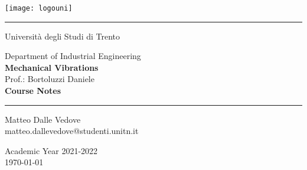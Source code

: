 \documentclass[10pt,letterpaper,oneside,openright]{book}
\begin{document}
	
	\frontmatter
	
	\begin{center}
		\vspace{3cm}
		\thispagestyle{empty}
		\texttt{[image: logouni]}
		
		\vspace{1cm}
		\rule{5cm}{0.5pt}
		\vspace{1cm}		
		
		{\Large Università degli Studi di Trento}
		
		\vspace{2cm}
		{\Large Department of Industrial Engineering} \\ \vspace{2mm}
		{\LARGE \textbf{Mechanical Vibrations}} \\ \vspace{2mm}
		{\Large Prof.: Bortoluzzi Daniele}\\
		
		\vspace{2cm}
		{\LARGE \textbf{Course Notes}}
		
		\vspace{1cm}
		\rule{5cm}{0.5pt}
		\vspace{1cm}	
		
		{\large 
			Matteo Dalle Vedove \\
			\makeatletter
			matteo.dallevedove@studenti.unitn.it
			
			\vspace{2cm}
			Academic Year 2021-2022 \\ \today}
	\end{center}
	
	\tableofcontents
	

	
	
	
	\mainmatter
	
	
	
	
	
	\appendix
	
	
\end{document}
